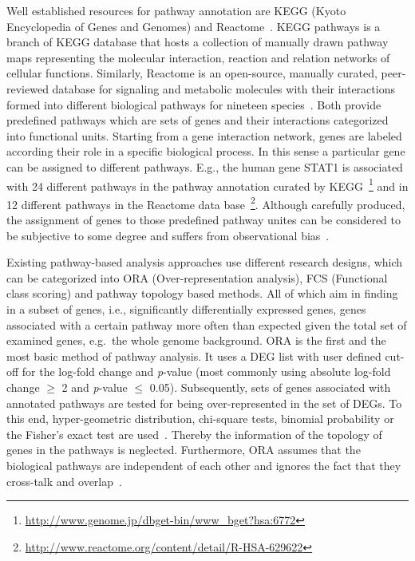 \documentclass[10pt,a4paper,twocolumn]{article}
\begin{document}
Well established resources for pathway annotation are KEGG (Kyoto
Encyclopedia of Genes and Genomes)\cite{Kegg} and
Reactome~\cite{Reactome2}. KEGG pathways is a branch of KEGG database that
hosts a collection of manually drawn pathway maps representing the
molecular interaction, reaction and relation networks of cellular
functions. Similarly, Reactome is an open-source, manually curated,
peer-reviewed database for signaling and metabolic molecules with their
interactions formed into different biological pathways for nineteen
species~\cite{Reactome2}. Both provide predefined pathways which are sets of
genes and their interactions categorized into functional units. Starting
from a gene interaction network, genes are labeled according their role in
a specific biological process. In this sense a particular gene can be
assigned to different pathways. E.g., the human gene STAT1 is associated
with 24 different pathways in the pathway annotation curated by
KEGG~\footnote{\url{http://www.genome.jp/dbget-bin/www_bget?hsa:6772}} and
in 12 different pathways in the Reactome data
base~\footnote{\url{http://www.reactome.org/content/detail/R-HSA-629622}}.
Although carefully produced, the assignment of genes to those predefined
pathway unites can be considered to be subjective to some degree and
suffers from observational bias~\cite{schnoes2013biases}.

Existing pathway-based analysis approaches use different research designs,
which can be categorized into ORA (Over-representation analysis), FCS
(Functional class scoring) and pathway topology based methods. All of which
aim in finding in a subset of genes, i.e., significantly differentially
expressed genes, genes associated with a certain pathway more often than
expected given the total set of examined genes, e.g.~the whole genome
background.  ORA is the first and the most basic method of pathway
analysis. It uses a DEG list with user defined cut-off for the log-fold
change and \textit{p}-value (most commonly using absolute log-fold change
$\geq$ 2 and \textit{p}-value $\leq$ 0.05). Subsequently, sets of genes
associated with annotated pathways are tested for being over-represented in
the set of DEGs. To this end, hyper-geometric distribution, chi-square
tests, binomial probability or the Fisher’s exact test are used~\cite{Bayer}. Thereby
the information of the topology of genes in the pathways is
neglected. Furthermore, ORA assumes that the biological
pathways are independent of each other and ignores the fact that they
cross-talk and overlap~\cite{Khatri2012,Campos}.
\end{document}
